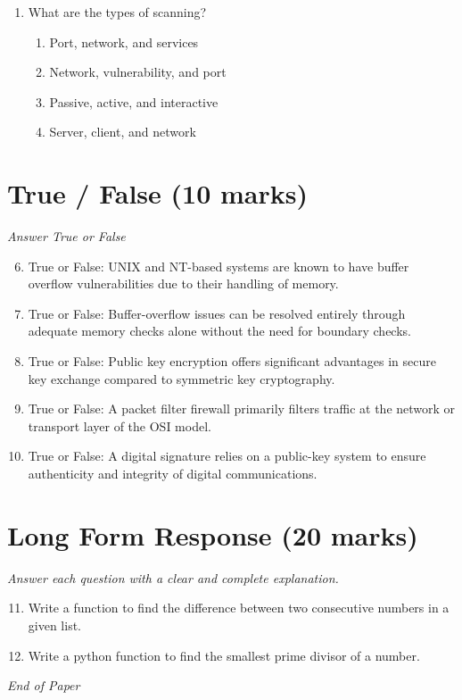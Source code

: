 \documentclass[12pt]{article}
\begin{document}
\begin{enumerate}[label=\arabic*.]
\begin{enumerate}[label=(\alph*)]
    \item Mishandling of undefined, poorly defined variables
    \item The Vulnerability that allows "fingerprinting" \& other enumeration of host information
    \item Overloading of transport-layer mechanisms
    \item Unauthorized network access
\end{enumerate}
\item What are the types of scanning?
\begin{enumerate}[label=(\alph*)]
    \item Port, network, and services
    \item Network, vulnerability, and port
    \item Passive, active, and interactive
    \item Server, client, and network
\end{enumerate}
\end{enumerate}

\section*{True / False (10 marks)}
\textit{Answer True or False}
\begin{enumerate}[label=\arabic*.]
\setcounter{enumi}{5}
\item True or False: UNIX and NT-based systems are known to have buffer overflow vulnerabilities due to their handling of memory.
\item True or False: Buffer-overflow issues can be resolved entirely through adequate memory checks alone without the need for boundary checks.
\item True or False: Public key encryption offers significant advantages in secure key exchange compared to symmetric key cryptography.
\item True or False: A packet filter firewall primarily filters traffic at the network or transport layer of the OSI model.
\item True or False: A digital signature relies on a public-key system to ensure authenticity and integrity of digital communications.
\end{enumerate}

\section*{Long Form Response (20 marks)}
\textit{Answer each question with a clear and complete explanation.}
\begin{enumerate}[label=\arabic*.]
\setcounter{enumi}{10}
\item Write a function to find the difference between two consecutive numbers in a given list.
\item Write a python function to find the smallest prime divisor of a number.
\end{enumerate}

\vfill
\noindent\textit{End of Paper}
\end{document}
